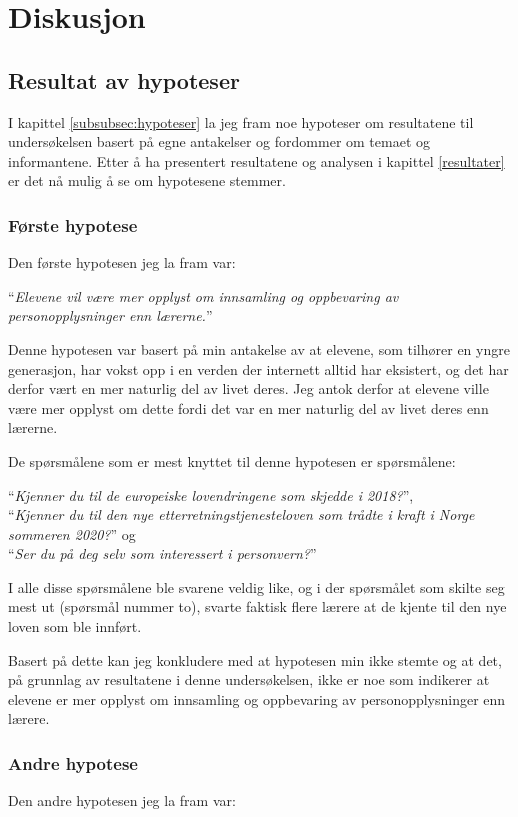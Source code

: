 \section{Diskusjon}

\subsection{Resultat av hypoteser}
I kapittel \ref{subsubsec:hypoteser} la jeg fram noe hypoteser om resultatene til undersøkelsen basert på egne antakelser og fordommer om temaet og informantene. Etter å ha presentert resultatene og analysen i kapittel \ref{resultater} er det nå mulig å se om hypotesene stemmer.

\subsubsection{Første hypotese}
Den første hypotesen jeg la fram var:

``\textit{Elevene vil være mer opplyst om innsamling og oppbevaring av personopplysninger enn lærerne.}''

Denne hypotesen var basert på min antakelse av at elevene, som tilhører en yngre generasjon, har vokst opp i en verden der internett alltid har eksistert, og det har derfor vært en mer naturlig del av livet deres. Jeg antok derfor at elevene ville være mer opplyst om dette fordi det var en mer naturlig del av livet deres enn lærerne. 

De spørsmålene som er mest knyttet til denne hypotesen er spørsmålene: 

``\textit{Kjenner du til de europeiske lovendringene som skjedde i 2018?}'',\\ ``\textit{Kjenner  du  til  den  nye  etterretningstjenesteloven  som  trådte  i  kraft  i  Norge sommeren 2020?}'' og\\ ``\textit{Ser du på deg selv som interessert i personvern?}''

I alle disse spørsmålene ble svarene veldig like, og i der spørsmålet som skilte seg mest ut (spørsmål nummer to), svarte faktisk flere lærere at de kjente til den nye loven som ble innført. 

Basert på dette kan jeg konkludere med at hypotesen min ikke stemte og at det, på grunnlag av resultatene i denne undersøkelsen, ikke er noe som indikerer at elevene er mer opplyst om innsamling og oppbevaring av personopplysninger enn lærere.

\subsubsection{Andre hypotese}
Den andre hypotesen jeg la fram var:

